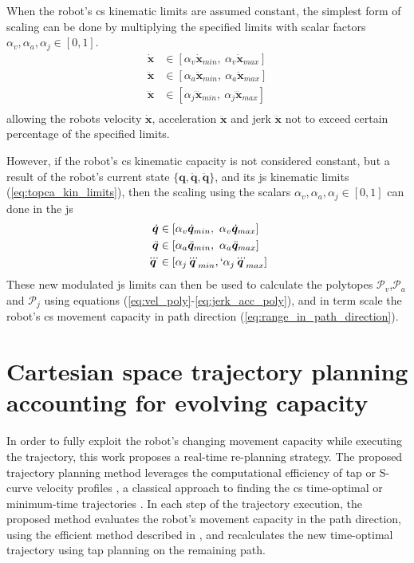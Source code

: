 When the robot's \gls{cs} kinematic limits are assumed constant, the simplest form of scaling can be done by multiplying the specified limits with scalar factors $\alpha_v,\alpha_a,\alpha_j\in[0,1]$.
\begin{equation}
\begin{split}
\dot{\bm{x}}&\in  [\alpha_v\dot{\bm{x}}_{min},~\alpha_v\dot{\bm{x}}_{max}] \\
\ddot{\bm{x}}&\in  [\alpha_a\ddot{\bm{x}}_{min},~\alpha_a\ddot{\bm{x}}_{max}] \\
\dddot{\bm{x}}&\in  [\alpha_j\dddot{\bm{x}}_{min},~\alpha_j\dddot{\bm{x}}_{max}] \\
 \end{split} \label{eq:limits_cs_alpha}
\end{equation}
allowing the robots velocity $\dot{\bm{x}}$, acceleration $\ddot{\bm{x}}$ and jerk $\dddot{\bm{x}}$ not to exceed certain percentage of the specified limits. 

However, if the robot's \gls{cs} kinematic capacity is not considered constant, but a result of the robot's current state $\{\bm{q},\ddot{\bm{q}},\ddot{\bm{q}}\}$, and its \gls{js} kinematic limits (\ref{eq:topca_kin_limits}), then the scaling using the scalars $\alpha_v,\alpha_a,\alpha_j\in[0,1]$ can done in the \gls{js}
\begin{equation}
\begin{split}
\dot{\bm{q}}&\in  [\alpha_v\dot{\bm{q}}_{min},~\alpha_v\dot{\bm{q}}_{max}] \\
\ddot{\bm{q}}&\in  [\alpha_a\ddot{\bm{q}}_{min},~\alpha_a\ddot{\bm{q}}_{max}] \\
\dddot{\bm{q}}&\in  [\alpha_j\dddot{\bm{q}}_{min},`\alpha_j\dddot{\bm{q}}_{max}] \\
 \end{split} \label{eq:limits_js_alpha}
\end{equation}
These new modulated \gls{js} limits can then be used to calculate the polytopes $\mathcal{P}_v$,$\mathcal{P}_a$ and $\mathcal{P}_j$ using equations (\ref{eq:vel_poly}-\ref{eq:jerk_acc_poly}), and in term scale the robot's \gls{cs} movement capacity in path direction (\ref{eq:range_in_path_direction}). 

\section{Cartesian space trajectory planning accounting for evolving capacity}
\label{ch:tap}


In order to fully exploit the robot's changing movement capacity while executing the trajectory, this work proposes a real-time re-planning strategy.
The proposed trajectory planning method leverages the computational efficiency of \gls{tap} or S-curve velocity profiles \cite[Chapter 9.2.2.2]{modernrobotics}\cite{scurve,ruckig}, a classical approach to finding the \gls{cs} time-optimal or minimum-time trajectories \cite{Gasparetto2012}. 
In each step of the trajectory execution, the proposed method evaluates the robot's movement capacity in the path direction, using the efficient method described in , and recalculates the new time-optimal trajectory using \gls{tap} planning on the remaining path. 

